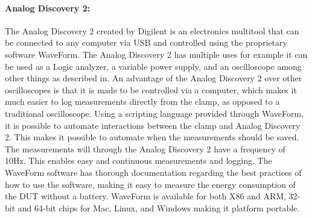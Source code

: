 \paragraph*{Analog Discovery 2:}\label{par:AnalDisc2}
The Analog Discovery 2 created by Digilent\cite{AnalogDiscovery2} is an electronics multitool that can be connected to any computer via USB and controlled using the proprietary software WaveForm. The Analog Discovery 2 has multiple uses for example it can be used as a Logic analyzer, a variable power supply, and an oscilloscope among other things as described in\cite{AnalogDoc}. An advantage of the Analog Discovery 2 over other oscilloscopes is that it is made to be controlled via a computer, which makes it much easier to log measurements directly from the clamp, as opposed to a traditional oscilloscope. Using a scripting language provided through WaveForm, it is possible to automate interactions between the clamp and Analog Discovery 2. This makes it possible to automate when the measurements should be saved. The measurements will through the Analog Discovery 2 have a frequency of 10Hz. This enables easy and continuous measurements and logging. The WaveForm software has thorough documentation regarding the best practices of how to use the software, making it easy to measure the energy consumption of the DUT without a battery. WaveForm is available for both X86 and ARM, 32-bit and 64-bit chips for Mac, Linux, and Windows making it platform portable.\cite{AnalogDoc}